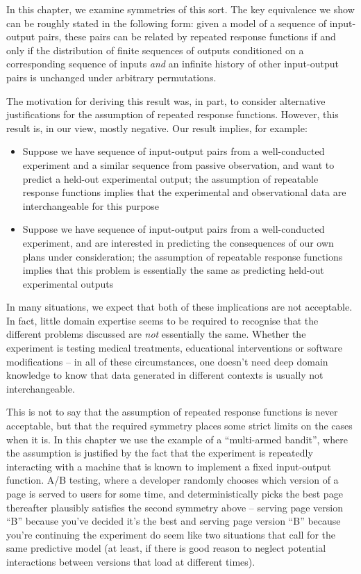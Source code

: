 In this chapter, we examine symmetries of this sort. The key equivalence we show can be roughly stated in the following form: given a model of a sequence of input-output pairs, these pairs can be related by repeated response functions if and only if the distribution of finite sequences of outputs conditioned on a corresponding sequence of inputs \emph{and} an infinite history of other input-output pairs is unchanged under arbitrary permutations.

The motivation for deriving this result was, in part, to consider alternative justifications for the assumption of repeated response functions. However, this result is, in our view, mostly negative. Our result implies, for example:
\begin{itemize}
    \item Suppose we have sequence of input-output pairs from a well-conducted experiment and a similar sequence from passive observation, and want to predict a held-out experimental output; the assumption of repeatable response functions implies that the experimental and observational data are interchangeable for this purpose 
    \item Suppose we have sequence of input-output pairs from a well-conducted experiment, and are interested in predicting the consequences of our own plans under consideration; the assumption of repeatable response functions implies that this problem is essentially the same as predicting held-out experimental outputs
\end{itemize}

In many situations, we expect that both of these implications are not acceptable. In fact, little domain expertise seems to be required to recognise that the different problems discussed are \emph{not} essentially the same. Whether the experiment is testing medical treatments, educational interventions or software modifications -- in all of these circumstances, one doesn't need deep domain knowledge to know that data generated in different contexts is usually not interchangeable.

This is not to say that the assumption of repeated response functions is never acceptable, but that the required symmetry places some strict limits on the cases when it is. In this chapter we use the example of a ``multi-armed bandit'', where the assumption is justified by the fact that the experiment is repeatedly interacting with a machine that is known to implement a fixed input-output function. A/B testing, where a developer randomly chooses which version of a page is served to users for some time, and deterministically picks the best page thereafter plausibly satisfies the second symmetry above -- serving page version ``B'' because you've decided it's the best and serving page version ``B'' because you're continuing the experiment do seem like two situations that call for the same predictive model (at least, if there is good reason to neglect potential interactions between versions that load at different times).

